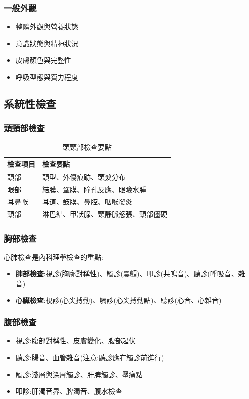\documentclass[12pt,a4paper]{article}
\begin{document}
\subsubsection{一般外觀}
\begin{itemize}[nosep]
    \item 整體外觀與營養狀態
    \item 意識狀態與精神狀況
    \item 皮膚顏色與完整性
    \item 呼吸型態與費力程度
\end{itemize}

\subsection{系統性檢查}
\subsubsection{頭頸部檢查}
\begin{table}[h]
    \centering
    \caption{頭頸部檢查要點}
    \begin{tabular}{p{3cm} p{11cm}}
        \toprule
        \textbf{檢查項目} & \textbf{檢查要點} \\
        \midrule
        頭部 & 頭型、外傷痕跡、頭髮分布 \\
        眼部 & 結膜、鞏膜、瞳孔反應、眼瞼水腫 \\
        耳鼻喉 & 耳道、鼓膜、鼻腔、咽喉發炎 \\
        頸部 & 淋巴結、甲狀腺、頸靜脈怒張、頸部僵硬 \\
        \bottomrule
    \end{tabular}
\end{table}

\subsubsection{胸部檢查}
心肺檢查是內科理學檢查的重點:
\begin{itemize}[nosep]
    \item \textbf{肺部檢查}:視診(胸廓對稱性)、觸診(震顫)、叩診(共鳴音)、聽診(呼吸音、雜音)
    \item \textbf{心臟檢查}:視診(心尖搏動)、觸診(心尖搏動點)、聽診(心音、心雜音)
\end{itemize}

\subsubsection{腹部檢查}
\begin{itemize}[nosep]
    \item 視診:腹部對稱性、皮膚變化、腹部起伏
    \item 聽診:腸音、血管雜音(注意:聽診應在觸診前進行)
    \item 觸診:淺層與深層觸診、肝脾觸診、壓痛點
    \item 叩診:肝濁音界、脾濁音、腹水檢查
\end{itemize}
\end{document}
